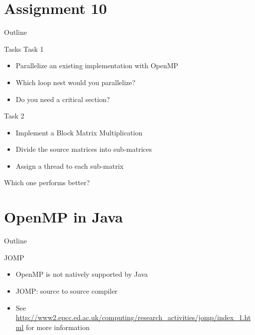 \section{Assignment 10}

\begin{frame}{Outline}
  \tableofcontents[current]
\end{frame}

\begin{frame}{Tasks}
  Task 1
  \begin{itemize}
  \item Parallelize an existing implementation with OpenMP
  \item Which loop nest would you parallelize?
  \item Do you need a critical section?
  \end{itemize}


  Task 2
  \begin{itemize}
  \item Implement a Block Matrix Multiplication
  \item Divide the source matrices into sub-matrices
  \item Assign a thread to each sub-matrix
  \end{itemize}


  Which one performs better?
\end{frame}


\section{OpenMP in Java}

\begin{frame}{Outline}
  \tableofcontents[current]
\end{frame}

\begin{frame}{JOMP}
  \begin{itemize}
  \item OpenMP is not natively supported by Java
  \item JOMP: source to source compiler
  \item See
    \url{http://www2.epcc.ed.ac.uk/computing/research_activities/jomp/index_1.html} 
    for more information
  \end{itemize}
\end{frame}

